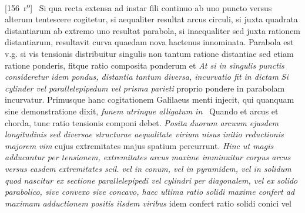 [156~r\textsuperscript{o}]
\pend%
\count{}
\count{}
\pstart%
%
%
%
% 
 \, Si qua recta extensa ad instar fili continuo ab uno puncto versus alterum tentescere cogitetur, si aequaliter resultat arcus circuli, si juxta quadrata distantiarum ab extremo uno resultat parabola, si inaequaliter sed juxta rationem distantiarum, resultavit curva quaedam nova hactenus innominata. Parabola est v.g. si vis tensionis distribuitur singulis non tantum ratione distantiae\protect{} sed etiam ratione ponderis\protect{}, fitque ratio composita ponderum et 
\textit{At si in singulis punctis consideretur idem pondus, distantia tantum diversa, incurvatio fit in dictam }
\textit{Si cylinder vel parallelepipedum vel prisma parieti } proprio pondere in parabolam incurvatur. Primusque hanc cogitationem Galilaeus\protect{} menti injecit, qui quanquam sine demonstratione dixit, \textit{funem utrinque alligatum in } 
\pend
\pstart {} \, Quando et arcus et chorda\protect{}, tunc ratio tensionis componi debet.
\textit{Posita duorum arcuum ejusdem longitudinis sed diversae structurae aequalitate virium nisus initio reductionis majorem vim } cujus extremitates majus spatium percurrunt.
\textit{Hinc ut magis adducantur per tensionem, extremitates arcus\protect{} maxime imminuitur corpus arcus versus easdem extremitates scil. vel in conum, vel in pyramidem, vel in solidum quod nascitur ex sectione parallelepipedi vel cylindri per diagonalem, vel ex solido parabolico, sive convexo sive concavo, haec ultima ratio solidi maxime confert ad maximam adductionem positis iisdem viribus } idem confert ratio solidi conici vel 
